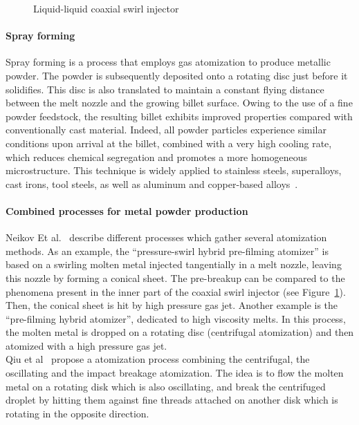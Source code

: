 \documentclass[../main]{subfiles}
\begin{document}
\vspace{0mm}
\begin{figure}[H]
    \centering
        
        \caption{Liquid-liquid coaxial swirl injector}
        \label{f:coaxial_swirl}
\end{figure}
\FloatBarrier
\vspace{0mm}

\paragraph{Spray forming}

Spray forming is a process that employs gas atomization to produce metallic powder. The powder is subsequently deposited onto a rotating disc just before it solidifies. This disc is also translated to maintain a constant flying distance between the melt nozzle and the growing billet surface. Owing to the use of a fine powder feedstock, the resulting billet exhibits improved properties compared with conventionally cast material. Indeed, all powder particles experience similar conditions upon arrival at the billet, combined with a very high cooling rate, which reduces chemical segregation and promotes a more homogeneous microstructure.
This technique is widely applied to stainless steels, superalloys, cast irons, tool steels, as well as aluminum and copper-based alloys~\cite{Gjesing2009CoupledAtomization,Wang2006CombinationSpray}.\\

\paragraph{Combined processes for metal powder production}

Neikov Et al.~\cite{Neikov2009HandbookNonFerrous} describe different processes which gather several atomization methods. As an example, the ``pressure-swirl hybrid pre-filming atomizer'' is based on a swirling molten metal injected tangentially in a melt nozzle, leaving this nozzle by forming a conical sheet. The pre-breakup can be compared to the phenomena present in the inner part of the coaxial swirl injector (see Figure~\ref{f:coaxial_swirl}). Then, the conical sheet is hit by high pressure gas jet. Another example is the ``pre-filming hybrid atomizer'', dedicated to high viscosity melts. In this process, the molten metal is dropped on a rotating disc (centrifugal atomization) and then atomized with a high pressure gas jet.\\
Qiu et al~\cite{Qiu2012StudyNew} propose a atomization process combining the centrifugal, the oscillating and the impact breakage atomization. The idea is to flow the molten metal on a rotating disk which is also oscillating, and break the centrifuged droplet by hitting them against fine threads attached on another disk which is rotating in the opposite direction.
\end{document}
